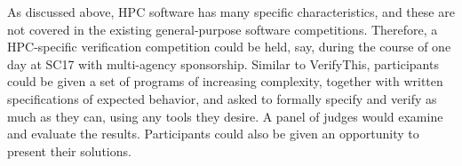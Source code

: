 As discussed above, HPC software has many specific characteristics, and these are not covered in the existing general-purpose software competitions.  Therefore, a HPC-specific verification competition could be held, say, during the course of one day at SC17 with multi-agency sponsorship.   Similar to VerifyThis, participants could be given a set of programs of increasing complexity, together with written specifications of expected behavior, and asked to formally specify and verify as much as they can, using any tools they desire.   A panel of judges would examine and evaluate the results.  Participants could also be given an opportunity to present their solutions.

